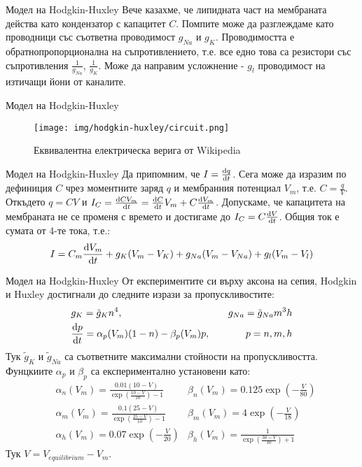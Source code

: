 \begin{frame}[t]{Модел на Hodgkin-Huxley}
  Вече казахме, че липидната част на мембраната действа като кондензатор с капацитет $C$. 
  Помпите може да разглеждаме като проводници със съответна проводимост $g_{Na}$ и $g_{K}$.
  Проводимостта е обратнопропорционална на съпротивлението, 
  т.е. все едно това са резистори със съпротивления $\frac{1}{g_{Na}}$, $\frac{1}{g_{K}}$.
  Може да направим усложнение - $g_{l}$ проводимост на изтичащи йони от каналите. 
\end{frame}

\begin{frame}[t]{Модел на Hodgkin-Huxley}
  \begin{figure}[htbp!]
      \centering
      \texttt{[image: img/hodgkin-huxley/circuit.png]}
      \caption{Еквивалентна електрическа верига от Wikipedia}
  \end{figure}
\end{frame}

\begin{frame}[t]{Модел на Hodgkin-Huxley}
  Да припомним, че $I = \dv{q}{t}$. 
  Сега може да изразим по дефиниция $C$ чрез моментните заряд $q$ и мембранния потенциал $V_m$, т.е. $C = \frac{q}{V}$.
  Откъдето $q = C V$ и $I_C = \dv{C V_m}{t} = \dv{C}{t}V_m + C\dv{V_m}{t}$. 
  Допускаме, че капацитета на мембраната не се променя с времето и достигаме до $I_C = C\dv{V}{t}$.
  Общия ток е сумата от 4-те тока, т.е.:
  \begin{equation*}
    I=C_{m}\dv{V_m}{t}+g_{K}(V_{m}-V_{K})+g_{Na}(V_{m}-V_{Na})+g_{l}(V_{m}-V_{l})
  \end{equation*}
\end{frame}

\begin{frame}[t]{Модел на Hodgkin-Huxley}
  От експериментите си върху аксона на сепия, Hodgkin и Huxley достигнали до следните изрази за пропускливостите:
  \begin{align*}
    &g_{K}=\tilde{g}_{K}n^4,\quad &g_{Na}=\tilde{g}_{Na}m^3h \\
    &\dv{p}{t}=\alpha_p(V_m)(1-n)-\beta_p(V_m)p,\quad &p={n,m,h}
  \end{align*}
  Тук $\tilde{g}_{K}$ и $\tilde{g}_{Na}$ са съответните максимални стойности на пропускливостта.
  Фунцкиите $\alpha_p$ и $\beta_p$ са експериментално установени като: 
  \begin{align*}
    &\alpha_{n}(V_{m})={\frac{0.01(10-V)}{\exp\left({\frac{10-V}{10}}\right)-1}} &\beta_{n}(V_{m})=0.125\exp\left(-\frac{V}{80}\right)\\
    &\alpha_{m}(V_{m})={\frac{0.1(25-V)}{\exp\left({\frac{25-V}{10}}\right)-1}} &\beta_{m}(V_{m})=4\exp\left(-\frac{V}{18}\right)\\
    &\alpha_{h}(V_{m})=0.07\exp\left(-{\frac{V}{20}}\right) &\beta_{h}(V_{m})={\frac{1}{\exp\left({\frac{30-V}{10}}\right)+1}}  
  \end{align*}
  Тук $V = V_{equilibrium} - V_m$.
\end{frame}


